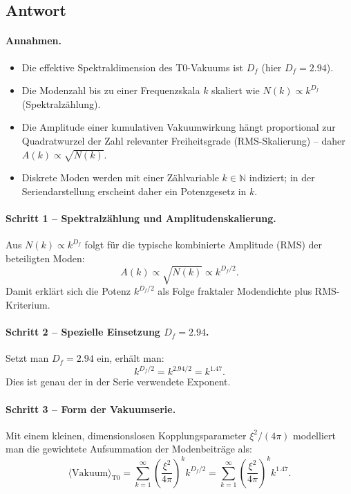 \documentclass[12pt,a4paper]{article}
\theoremstyle{remark}
\newenvironment{answer}{\subsection*{Antwort}}{\vspace{1em}}
\begin{document}
\begin{answer}
	\paragraph{Annahmen.}
	\begin{itemize}
		\item Die effektive Spektraldimension des T0-Vakuums ist \( D_f \) (hier \( D_f = 2.94 \)).
		\item Die Modenzahl bis zu einer Frequenzskala \( k \) skaliert wie \( N(k) \propto k^{D_f} \) (Spektralzählung).
		\item Die Amplitude einer kumulativen Vakuumwirkung hängt proportional zur Quadratwurzel der Zahl relevanter Freiheitsgrade (RMS-Skalierung) – daher \( A(k) \propto \sqrt{N(k)} \).
		\item Diskrete Moden werden mit einer Zählvariable \( k \in \mathbb{N} \) indiziert; in der Seriendarstellung erscheint daher ein Potenzgesetz in \( k \).
	\end{itemize}
	
	\paragraph{Schritt 1 – Spektralzählung und Amplitudenskalierung.}
	Aus \( N(k) \propto k^{D_f} \) folgt für die typische kombinierte Amplitude (RMS) der beteiligten Moden:
	\begin{equation}
		A(k) \propto \sqrt{N(k)} \propto k^{D_f / 2}.
	\end{equation}
	Damit erklärt sich die Potenz \( k^{D_f / 2} \) als Folge fraktaler Modendichte plus RMS-Kriterium.
	
	\paragraph{Schritt 2 – Spezielle Einsetzung \( D_f = 2.94 \).}
	Setzt man \( D_f = 2.94 \) ein, erhält man:
	\begin{equation}
		k^{D_f / 2} = k^{2.94 / 2} = k^{1.47}.
	\end{equation}
	Dies ist genau der in der Serie verwendete Exponent.
	
	\paragraph{Schritt 3 – Form der Vakuumserie.}
	Mit einem kleinen, dimensionslosen Kopplungsparameter \( \xi^2 / (4\pi) \) modelliert man die gewichtete Aufsummation der Modenbeiträge als:
	\begin{equation}
		\langle \mathrm{Vakuum} \rangle_{\text{T0}} = \sum_{k=1}^\infty \left( \frac{\xi^2}{4\pi} \right)^k k^{D_f / 2} = \sum_{k=1}^\infty \left( \frac{\xi^2}{4\pi} \right)^k k^{1.47}.
	\end{equation}
	

\end{answer}
\end{document}
